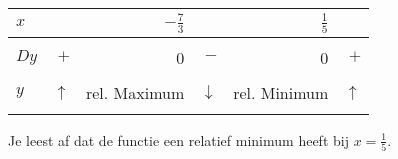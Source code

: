 \documentclass{article}
\begin{document}
\begin{enumerate}
\hspace{5mm}\begin{tabular}{ |  l | r | r | r | r| r| }
\hline
$x$ & \hspace{8mm}  & $-\frac{7}{3}$ & \hspace{8mm} & $\frac{1}{5}$ &  \hspace{8mm} \\  \hline
  &   &   &    &  &       \\ 
$Dy$ & $+$ &  0 & $-$ & 0 & $+$ \\ 
  &   &   &   &  &   \\ \hline
$y$ & $\uparrow$ &  rel. Maximum & $\downarrow$ & rel. Minimum  & $\uparrow$\\
 &  &  &  &  &     \\ \hline
\end{tabular}\vspace{5mm}

Je leest af dat de functie een relatief minimum heeft bij $x=\frac{1}{5}$.

\end{enumerate}
\end{document}
